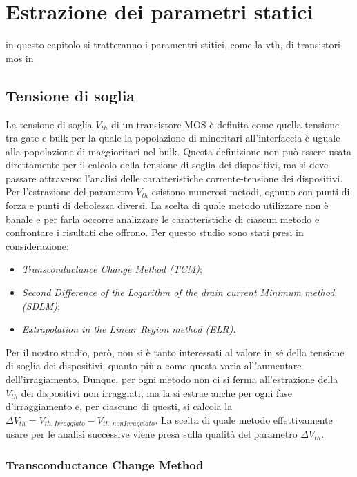 \documentclass[12pt, letterpaper]{book}
\begin{document}
\chapter{Estrazione dei parametri statici}
in questo capitolo si tratteranno i paramentri stitici, come la vth, di transistori mos in 

\section{Tensione di soglia}

La tensione di soglia $V_{th}$ di un transistore MOS è definita come quella tensione tra gate e bulk per la quale la popolazione di minoritari all'interfaccia è uguale alla popolazione di maggioritari nel bulk. Questa definizione non può essere usata direttamente per il calcolo della tensione di soglia dei dispositivi, ma si deve passare attraverso l'analisi delle caratteristiche corrente-tensione dei dispositivi. \\
Per l'estrazione del parametro $V_{th}$ esistono numerosi metodi, ognuno con punti di forza e punti di debolezza diversi. La scelta di quale metodo utilizzare non è banale e per farla occorre analizzare le caratteristiche di ciascun metodo e confrontare i risultati che offrono. Per questo studio sono stati presi in considerazione:

\begin{itemize}
  \item \emph{Transconductance Change Method (TCM)};
  \item \emph{Second Difference of the Logarithm of the drain current Minimum method (SDLM)};
  \item \emph{Extrapolation in the Linear Region method (ELR)}.
\end{itemize}

Per il nostro studio, però, non si è tanto interessati al valore in sé della tensione di soglia dei dispositivi, quanto più a come questa varia all'aumentare dell'irragiamento. Dunque, per ogni metodo non ci si ferma all'estrazione della $V_{th}$ dei dispositivi non irraggiati, ma la si estrae anche per ogni fase d'irraggiamento e, per ciascuno di questi, si calcola la $\Delta V_{th} = V_{th, Irraggiato}-V_{th, non Irraggiato}$. La scelta di quale metodo effettivamente usare per le analisi successive viene presa sulla qualità del parametro $\Delta V_{th}$.


\subsection{Transconductance Change Method}
\end{document}
